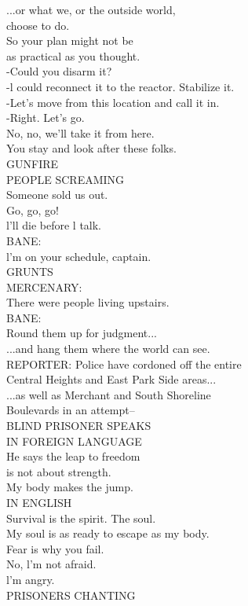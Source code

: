 \documentclass{article}
\begin{document}
\begin{multicols}{3}
...or what we, or the outside world,\\
choose to do.\\
So your plan might not be\\
as practical as you thought.\\
-Could you disarm it?\\
-l could reconnect it to the reactor. Stabilize it.\\
-Let's move from this location and call it in.\\
-Right. Let's go.\\
No, no, we'll take it from here.\\
You stay and look after these folks.\\
GUNFIRE\\
PEOPLE SCREAMING\\
Someone sold us out.\\
Go, go, go!\\
l'll die before l talk.\\
BANE:\\
l'm on your schedule, captain.\\
GRUNTS\\
MERCENARY:\\
There were people living upstairs.\\
BANE:\\
Round them up for judgment...\\
...and hang them where the world can see.\\
REPORTER: Police have cordoned off the entire\\
Central Heights and East Park Side areas...\\
...as well as Merchant and South Shoreline\\
Boulevards in an attempt--\\
BLIND PRISONER SPEAKS\\
IN FOREIGN LANGUAGE\\
He says the leap to freedom\\
is not about strength.\\
My body makes the jump.\\
IN ENGLISH\\
Survival is the spirit. The soul.\\
My soul is as ready to escape as my body.\\
Fear is why you fail.\\
No, l'm not afraid.\\
l'm angry.\\
PRISONERS CHANTING\\

\end{multicols}
\end{document}
